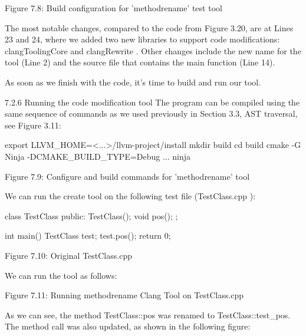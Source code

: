 \begin{center}
Figure 7.8: Build configuration for 'methodrename' test tool
\end{center}

The most notable changes, compared to the code from Figure 3.20, are at Lines 23 and 24, where we added two new libraries to support code modifications: clangToolingCore and clangRewrite . Other changes include the new name for the tool (Line 2) and the source file that contains the main function (Line 14).

As soon as we finish with the code, it's time to build and run our tool.

7.2.6 Running the code modification tool
The program can be compiled using the same sequence of commands as we used previously in Section 3.3, AST traversal, see Figure 3.11:

\begin{shell}
export LLVM_HOME=<...>/llvm-project/install
mkdir build
cd build
cmake -G Ninja -DCMAKE_BUILD_TYPE=Debug ...
ninja
\end{shell}

\begin{center}
Figure 7.9: Configure and build commands for 'methodrename' tool
\end{center}

We can run the create tool on the following test file (TestClass.cpp ):

\begin{cpp}
class TestClass {
public:
  TestClass(){};
  void pos(){};
};

int main() {
  TestClass test;
  test.pos();
  return 0;
}
\end{cpp}


\begin{center}
Figure 7.10: Original TestClass.cpp
\end{center}

We can run the tool as follows:



\begin{center}
Figure 7.11: Running methodrename Clang Tool on TestClass.cpp
\end{center}

As we can see, the method TestClass::pos was renamed to TestClass::test\_pos. The method call was also updated, as shown in the following figure:

